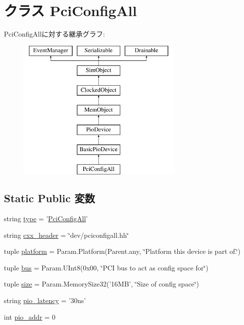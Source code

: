 \hypertarget{classPci_1_1PciConfigAll}{
\section{クラス PciConfigAll}
\label{classPci_1_1PciConfigAll}
}
PciConfigAllに対する継承グラフ:\begin{figure}[H]
\begin{center}
\leavevmode
\includegraphics[height=7cm]{classPci_1_1PciConfigAll}
\end{center}
\end{figure}
\subsection*{Static Public 変数}
\begin{DoxyCompactItemize}
\item 
string \hyperlink{classPci_1_1PciConfigAll_acce15679d830831b0bbe8ebc2a60b2ca}{type} = '\hyperlink{classPci_1_1PciConfigAll}{PciConfigAll}'
\item 
string \hyperlink{classPci_1_1PciConfigAll_a17da7064bc5c518791f0c891eff05fda}{cxx\_\-header} = \char`\"{}dev/pciconfigall.hh\char`\"{}
\item 
tuple \hyperlink{classPci_1_1PciConfigAll_ae6d09ca44893db6cdb66d62deaa1aefd}{platform} = Param.Platform(Parent.any, \char`\"{}Platform this device is part of.\char`\"{})
\item 
tuple \hyperlink{classPci_1_1PciConfigAll_aef53eac6bf8304a31e35b7307a2c3fe2}{bus} = Param.UInt8(0x00, \char`\"{}PCI bus to act as config space for\char`\"{})
\item 
tuple \hyperlink{classPci_1_1PciConfigAll_a377e5da8df1f89c5468c8b8cd07eac89}{size} = Param.MemorySize32('16MB', \char`\"{}Size of config space\char`\"{})
\item 
string \hyperlink{classPci_1_1PciConfigAll_aa933b0c4a9c52039f5a3f5a97a97fc9f}{pio\_\-latency} = '30ns'
\item 
int \hyperlink{classPci_1_1PciConfigAll_a659450bdbf05cdba8edf24c47df67671}{pio\_\-addr} = 0
\end{DoxyCompactItemize}


